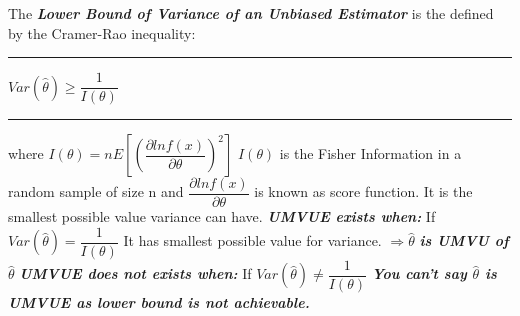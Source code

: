 \documentclass[]{article}
\begin{document}
\Large The \textbf{\textit{Lower Bound of Variance of an Unbiased Estimator}} is the defined by the Cramer-Rao inequality:
\newline
\newline\Large\rule{3cm}{0pt} $Var (\hat\theta) \geq  \dfrac{  1   }{ I (\theta) }$ \Large\rule{1cm}{0pt} where $I (\theta) = nE \left[\left(  \dfrac{  \partial ln f(x)  }{ \partial\theta }    \right)^2 \right] $ 
\newline
\newline
\newline $I (\theta)$ is the Fisher Information in a random sample of size n and $\dfrac {  \partial ln f(x)  }{ \partial\theta }$ is known as score function. It is the smallest possible value variance can have. 
\newline
\newline
\textbf{\textit{UMVUE exists when:}}
\newline
\newline If $Var (\hat\theta) =  \dfrac{  1   }{ I (\theta) }$ It has smallest possible value for variance.
\newline
\newline $\Longrightarrow  \hat\theta$ \textbf{\textit{ is UMVU of }} $ \hat\theta$ 
\newline
\newline
\textbf{\textit{UMVUE does not exists when:}}
\newline
\newline If $Var (\hat\theta) \neq  \dfrac{  1   }{ I (\theta) }$  \textbf{\textit{You can't say $\hat\theta$ is UMVUE as lower bound is not achievable.}}


\newpage
\end{document}
